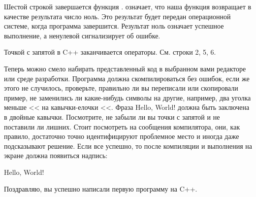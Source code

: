 \documentclass{article}
\begin{document}
Шестой строкой завершается функция .  означает, что наша функция возвращает в качестве результата число ноль. Это результат будет передан операционной системе, когда программа завершится. Результат ноль означает успешное выполнение, а ненулевой сигнализирует об ошибке.

Точкой с запятой в C++ заканчивается операторы. См. строки 2, 5, 6.

Теперь можно смело набирать представленный код в выбранном вами редакторе или среде разработки. Программа должна скомпилироваться без ошибок, если же этого не случилось, проверьте, правильно ли вы переписали или скопировали пример, не заменились ли какие-нибудь символы на другие, например, два уголка меньше <{}< на кавычки-елочки <<. Фраза Hello, World! должна быть заключена в двойные кавычки. Посмотрите, не забыли ли вы точки с запятой и не поставили ли лишних. Стоит посмотреть на сообщения компилятора, они, как правило, достаточно точно идентифицируют проблемное место и иногда даже подсказывают решение. Если все успешно, то после компиляции и выполнения на экране должна появиться надпись:

Hello, World!

Поздравляю, вы успешно написали первую программу на C++.
\end{document}
